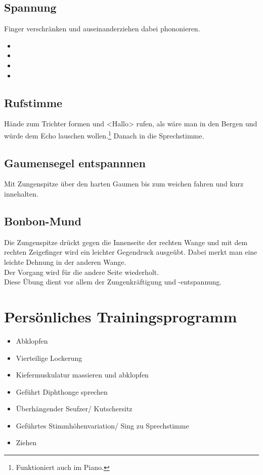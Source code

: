 \documentclass[ngerman, a4paper, twoside]{scrbook}%
\begin{document}
		\section{Spannung}
	  Finger verschränken und auseinanderziehen dabei phononieren.
	  \begin{itemize}
	  \item \textipa{[ft]}
	  \item \textipa{[jo]}
	  \item \textipa{[mo]}
	  \item \textipa{[so]]}
	  \end{itemize}

		\section{Rufstimme}
	  Hände zum Trichter formen und <Hallo> rufen, als wäre man in den Bergen und würde dem Echo lauschen wollen.\footnote{Funktioniert auch im Piano.} Danach in die Sprechstimme.

		\section{Gaumensegel entspannnen}
	  Mit Zungenspitze über den harten Gaumen bis zum weichen fahren und kurz innehalten.

		\section{Bonbon-Mund}
		Die Zungenspitze drückt gegen die Innenseite der rechten Wange und mit dem rechten Zeigefinger wird ein leichter Gegendruck ausgeübt. Dabei merkt man eine leichte Dehnung in der anderen Wange.\\
		Der Vorgang wird für die andere Seite wiederholt. \\

		Diese Übung dient vor allem der Zungenkräftigung und -entspannung.





	  \chapter{Persönliches Trainingsprogramm}
	  \begin{itemize}
	  	\item Abklopfen
	  	\item Vierteilige Lockerung
	  	\item Kiefermuskulatur massieren und abklopfen
	  	\item Geführt Diphthonge sprechen
	  	\item Überhängender Seufzer/ Kutschersitz
	  	\item Geführtes Stimmhöhenvariation/ Sing zu Sprechstimme
	  	\item Ziehen
	  \end{itemize}
\end{document}
